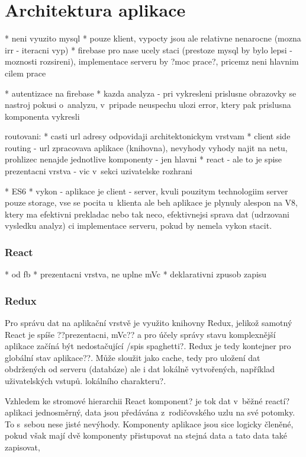 \section{Architektura aplikace}

* neni vyuzito mysql
* pouze klient, vypocty jsou ale relativne nenarocne (mozna irr - iteracni vyp)
* firebase pro nase ucely staci (prestoze mysql by bylo lepsi - moznosti rozsireni), implementace serveru by ?moc prace?, pricemz neni hlavnim cilem prace


* autentizace na firebase
* kazda analyza - pri vykresleni prislusne obrazovky se nastroj pokusi o~analyzu, v~pripade neuspechu ulozi error, ktery pak prislusna komponenta vykresli

routovani:
* casti url adresy odpovidaji architektonickym vrstvam
* client side routing - url zpracovava aplikace (knihovna), nevyhody vyhody najit na netu, prohlizec nenajde jednotlive komponenty - jen hlavni
* react - ale to je spise prezentacni vrstva - vic v~sekci uzivatelske rozhrani

* ES6
* vykon - aplikace je client - server, kvuli pouzitym technologiim server pouze storage, vse se pocita u~klienta ale beh aplikace je plynuly alespon na V8, ktery ma efektivni prekladac nebo tak neco, efektivnejsi sprava dat (udrzovani vysledku analyz) ci implementace serveru, pokud by nemela vykon stacit.

\subsubsection{React}
* od fb
* prezentacni vrstva, ne uplne mVc
* deklarativni zpusob zapisu

\subsubsection{Redux}
Pro správu dat na aplikační vrstvě je využito knihovny Redux, jelikož samotný React je spíše ??prezentacni, mVc?? a pro účely správy stavu komplexnější aplikace začíná být nedostačující /spis spaghetti?. Redux je tedy kontejner pro globální stav aplikace??. Může sloužit jako cache, tedy pro uložení dat obdržených od serveru (databáze) ale i dat lokálně vytvořených, například uživatelských vstupů. lokálního charakteru?. 


Vzhledem ke stromové hierarchii React komponent? je tok dat v~běžné reactí? aplikaci jednosměrný, data jsou předávána z~rodičovského uzlu na své potomky. To s~sebou nese jisté nevýhody. Komponenty aplikace jsou sice logicky členěné, pokud však mají dvě komponenty přistupovat na stejná data a tato data také zapisovat,  

